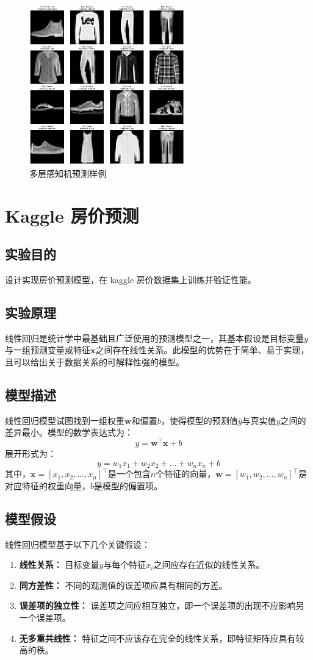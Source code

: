 \documentclass[a4paper,12pt]{article}
\begin{document}
\begin{figure}[htbp]
	\centering
	\includegraphics[width=0.6\textwidth]{7.png}
	\caption{多层感知机预测样例}
\end{figure}


\newpage
\section{Kaggle 房价预测}
\subsection{实验目的}
设计实现房价预测模型，在 kaggle 房价数据集上训练并验证性能。
\subsection{实验原理}
线性回归是统计学中最基础且广泛使用的预测模型之一，其基本假设是目标变量$y$与一组预测变量或特征$\mathbf{x}$之间存在线性关系。此模型的优势在于简单、易于实现，且可以给出关于数据关系的可解释性强的模型。

\subsection{模型描述}
线性回归模型试图找到一组权重$\mathbf{w}$和偏置$b$，使得模型的预测值$\hat{y}$与真实值$y$之间的差异最小。模型的数学表达式为：
\[
y = \mathbf{w}^\top \mathbf{x} + b
\]
展开形式为：
\[
y = w_1 x_1 + w_2 x_2 + \ldots + w_n x_n + b
\]
其中，$\mathbf{x} = [x_1, x_2, \ldots, x_n]^\top$是一个包含$n$个特征的向量，$\mathbf{w} = [w_1, w_2, \ldots, w_n]^\top$是对应特征的权重向量，$b$是模型的偏置项。

\subsection{模型假设}
线性回归模型基于以下几个关键假设：
\begin{enumerate}
	\item \textbf{线性关系：} 目标变量$y$与每个特征$x_i$之间应存在近似的线性关系。
	\item \textbf{同方差性：} 不同的观测值的误差项应具有相同的方差。
	\item \textbf{误差项的独立性：} 误差项之间应相互独立，即一个误差项的出现不应影响另一个误差项。
	\item \textbf{无多重共线性：} 特征之间不应该存在完全的线性关系，即特征矩阵应具有较高的秩。
\end{enumerate}
\end{document}
